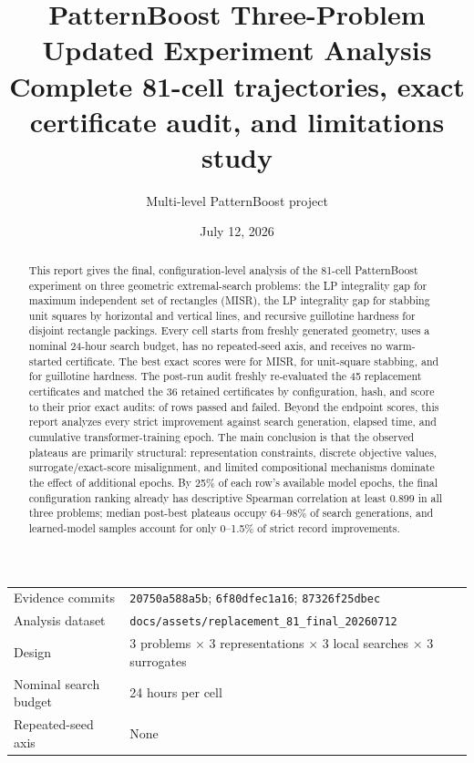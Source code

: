 \documentclass[11pt]{article}
\title{\textbf{PatternBoost Three-Problem Updated Experiment Analysis}\\[0.4em]
\large Complete 81-cell trajectories, exact certificate audit, and limitations study}
\author{Multi-level PatternBoost project}
\date{July 12, 2026}
\newcommand{\code}[1]{\texttt{#1}}
\begin{document}
\maketitle

\begin{center}
\begin{tabular}{@{}ll@{}}
\toprule
Evidence commits & \code{20750a588a5b}; \code{6f80dfec1a16}; \code{87326f25dbec} \\
Analysis dataset & \code{docs/assets/replacement\_81\_final\_20260712} \\
Design & $3$ problems $\times$ $3$ representations $\times$ $3$ local searches $\times$ $3$ surrogates \\
Nominal search budget & 24 hours per cell \\
Repeated-seed axis & None \\
\bottomrule
\end{tabular}
\end{center}

\begin{abstract}
This report gives the final, configuration-level analysis of the 81-cell
PatternBoost experiment on three geometric extremal-search problems: the LP
integrality gap for maximum independent set of rectangles (MISR), the LP
integrality gap for stabbing unit squares by horizontal and vertical lines,
and recursive guillotine hardness for disjoint rectangle packings.  Every
cell starts from freshly generated geometry, uses a nominal 24-hour search
budget, has no repeated-seed axis, and receives no warm-started certificate.  The best
exact scores were \MisrBest{} for MISR, \UnitSquareBest{} for unit-square
stabbing, and \GuillotineBest{} for guillotine hardness.  The post-run audit
freshly re-evaluated the 45 replacement certificates and matched the 36
retained certificates by configuration, hash, and score to their prior exact
audits: \AuditPassed{} of \AuditTotal{} rows passed and \AuditFailed{} failed.
Beyond the endpoint
scores, this report analyzes every strict improvement against search
generation, elapsed time, and cumulative transformer-training epoch.  The
main conclusion is that the observed plateaus are primarily structural:
representation constraints, discrete objective values, surrogate/exact-score
misalignment, and limited compositional mechanisms dominate the effect of
additional epochs.  By 25\% of each row's available model epochs, the final configuration
ranking already has descriptive Spearman correlation at least $0.899$ in all
three problems; median post-best plateaus occupy 64--98\% of search
generations, and learned-model samples account for only 0--1.5\% of strict
record improvements.
\end{abstract}
\end{document}
